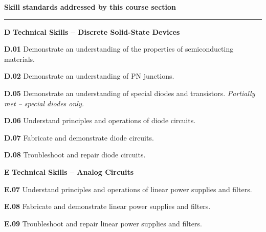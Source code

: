 \vskip 10pt

\noindent
{\bf Skill standards addressed by this course section}

\vskip 5pt

\hrule \vskip 10pt
\noindent
{}

\vskip 5pt

\medskip
\item{\bf D} {\bf Technical Skills -- Discrete Solid-State Devices}
\item{\bf D.01} Demonstrate an understanding of the properties of semiconducting materials.
\item{\bf D.02} Demonstrate an understanding of PN junctions.
\item{\bf D.05} Demonstrate an understanding of special diodes and transistors.  {\it Partially met -- special diodes only.}
\item{\bf D.06} Understand principles and operations of diode circuits.
\item{\bf D.07} Fabricate and demonstrate diode circuits.
\item{\bf D.08} Troubleshoot and repair diode circuits.
\item{\bf E} {\bf Technical Skills -- Analog Circuits}
\item{\bf E.07} Understand principles and operations of linear power supplies and filters.
\item{\bf E.08} Fabricate and demonstrate linear power supplies and filters.
\item{\bf E.09} Troubleshoot and repair linear power supplies and filters.
\medskip

\vskip 5pt

